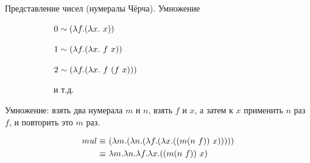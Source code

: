 \begin{frame}{Представление чисел (нумералы Чёрча). Умножение}
\begin{figure}[t]
    \begin{subfigure}[t]{0.45\textwidth}
$ 0 \sim (\lambda f . (\lambda x . \ x))$

$ 1 \sim (\lambda f . (\lambda x . \ f\ x))$

$ 2 \sim (\lambda f . (\lambda x . \ f\ (f\ x)))$

  и т.д.
    \end{subfigure}
    \begin{subfigure}[t]{0.45\textwidth}
    \begin{minipage}{\textwidth}
    \numeralIsFor
    \end{minipage}
    \end{subfigure}
\end{figure}

  \vspace{1cm}


Умножение: взять два нумерала $m$ и $n$, взять $f$ и $x$, а затем к $x$ применить $n$ раз $f$, и повторить это $m$ раз.

\begin{align*}
mul \equiv &\ (\lambda m . (\lambda n . (\lambda f . (\lambda x . ((m (n\ f )){\ x} )))))\\
\equiv &\ \lambda m. \lambda n. \lambda f. \lambda x. ((m (n\ f )) \ x) \\
\end{align*}
\end{frame}



\newcommand{\redex}[2]{\app{\tr{#1}}{\tb{#2}}}

